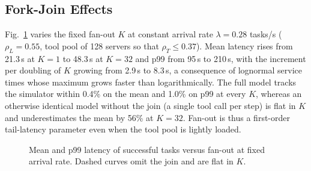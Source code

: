 \documentclass[journal]{IEEEtran}
\begin{document}
\subsection{Fork-Join Effects}
Fig.~\ref{fig:forkjoin} varies the fixed fan-out $K$ at constant arrival rate $\lambda=0.28$ tasks/s ($\rho_L=0.55$, tool pool of 128 servers so that $\rho_T\le0.37$). Mean latency rises from 21.3\,s at $K=1$ to 48.3\,s at $K=32$ and p99 from 95\,s to 210\,s, with the increment per doubling of $K$ growing from 2.9\,s to 8.3\,s, a consequence of lognormal service times whose maximum grows faster than logarithmically. The full model tracks the simulator within 0.4\% on the mean and 1.0\% on p99 at every $K$, whereas an otherwise identical model without the join (a single tool call per step) is flat in $K$ and underestimates the mean by 56\% at $K=32$. Fan-out is thus a first-order tail-latency parameter even when the tool pool is lightly loaded.
\begin{figure}[t]
\centering
{}
\caption{Mean and p99 latency of successful tasks versus fan-out at fixed arrival rate. Dashed curves omit the join and are flat in $K$.}
\label{fig:forkjoin}
\end{figure}
\end{document}
